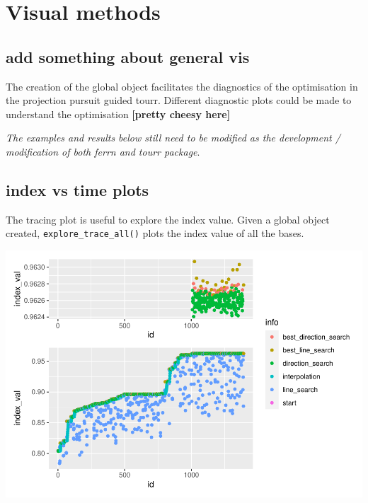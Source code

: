 \documentclass[12pt]{article}
\newenvironment{Shaded}{\begin{snugshade}}{\end{snugshade}}
\newcommand{\DataTypeTok}[1]{\textcolor[rgb]{0.13,0.29,0.53}{#1}}
\newcommand{\KeywordTok}[1]{\textcolor[rgb]{0.13,0.29,0.53}{\textbf{#1}}}
\newcommand{\NormalTok}[1]{#1}
\newcommand{\OperatorTok}[1]{\textcolor[rgb]{0.81,0.36,0.00}{\textbf{#1}}}
\newcommand{\OtherTok}[1]{\textcolor[rgb]{0.56,0.35,0.01}{#1}}
\newcommand{\StringTok}[1]{\textcolor[rgb]{0.31,0.60,0.02}{#1}}
\begin{document}
\hypertarget{visual-methods}{%
\section{Visual methods}\label{visual-methods}}

\hypertarget{add-something-about-general-vis}{%
\subsection{add something about general
vis}\label{add-something-about-general-vis}}

The creation of the global object facilitates the diagnostics of the
optimisation in the projection pursuit guided tourr. Different
diagnostic plots could be made to understand the optimisation
\textbf{{[}pretty cheesy here{]}}

\emph{The examples and results below still need to be modified as the
development / modification of both ferrn and tourr package}.

\hypertarget{index-vs-time-plots}{%
\subsection{index vs time plots}\label{index-vs-time-plots}}

The tracing plot is useful to explore the index value. Given a global
object created, \texttt{explore\_trace\_all()} plots the index value of
all the bases.

\begin{Shaded}
\end{Shaded}

\includegraphics{paper_files/figure-latex/unnamed-chunk-7-1.pdf}
\end{document}
